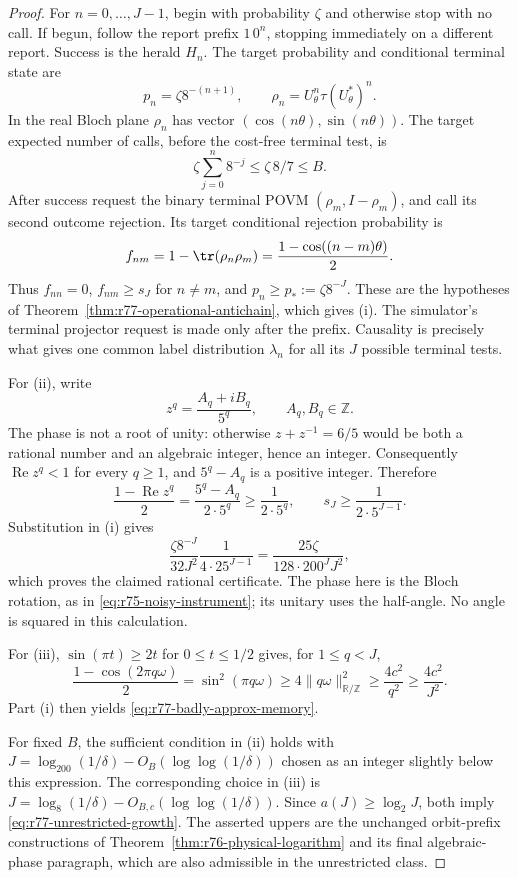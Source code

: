 \begin{proof}
For $n=0,\ldots,J-1$, begin with probability $\zeta$ and otherwise
stop with no call.  If begun, follow the report prefix $1\,0^n$,
stopping immediately on a different report.  Success is the herald
$H_n$.  The target probability and conditional terminal state are
\[
 p_n=\zeta8^{-(n+1)},\qquad
 \rho_n=U_\theta^n\tau(U_\theta^*)^n.
\]
In the real Bloch plane $\rho_n$ has vector
$(\cos(n\theta),\sin(n\theta))$.  The target expected number of
calls, before the cost-free terminal test, is
\[
 \zeta\sum_{j=0}^{n}8^{-j}\le\zeta\,8/7\le B.
\]
After success request the binary terminal POVM
$(\rho_m,I-\rho_m)$, and call its second outcome rejection.  Its
target conditional rejection probability is
\[
 f_{nm}=1-\tr(\rho_n\rho_m)
       =\frac{1-\cos((n-m)\theta)}2.
\]
Thus $f_{nn}=0$, $f_{nm}\ge s_J$ for $n\ne m$, and
$p_n\ge p_*:=\zeta8^{-J}$.  These are the hypotheses of
Theorem~\ref{thm:r77-operational-antichain}, which gives (i).
The simulator's terminal projector request is made only after the
prefix.  Causality is precisely what gives one common label
distribution $\lambda_n$ for all its $J$ possible terminal tests.

For (ii), write
\[
 z^q=\frac{A_q+iB_q}{5^q},\qquad A_q,B_q\in\mathbb Z.
\]
The phase is not a root of unity: otherwise $z+z^{-1}=6/5$ would
be both a rational number and an algebraic integer, hence an integer.
Consequently $\operatorname{Re}z^q<1$ for every $q\ge1$, and
$5^q-A_q$ is a positive integer.  Therefore
\[
 \frac{1-\operatorname{Re}z^q}{2}
 =\frac{5^q-A_q}{2\cdot5^q}\ge\frac1{2\cdot5^q},
 \qquad s_J\ge\frac1{2\cdot5^{J-1}}.
\]
Substitution in (i) gives
\[
 \frac{\zeta8^{-J}}{32J^2}\frac1{4\cdot25^{J-1}}
 =\frac{25\zeta}{128\cdot200^J J^2},
\]
which proves the claimed rational certificate.  The phase here is
the Bloch rotation, as in \eqref{eq:r75-noisy-instrument}; its unitary
uses the half-angle.  No angle is squared in this calculation.

For (iii), $\sin(\pi t)\ge2t$ for $0\le t\le1/2$ gives,
for $1\le q<J$,
\[
 \frac{1-\cos(2\pi q\omega)}2
 =\sin^2(\pi q\omega)
 \ge4\|q\omega\|_{\mathbb R/\mathbb Z}^2
 \ge\frac{4c^2}{q^2}\ge\frac{4c^2}{J^2}.
\]
Part (i) then yields \eqref{eq:r77-badly-approx-memory}.

For fixed $B$, the sufficient condition in (ii) holds with
$J=\log_{200}(1/\delta)-O_B(\log\log(1/\delta))$ chosen as an
integer slightly below this expression.  The corresponding choice in
(iii) is $J=\log_8(1/\delta)-O_{B,c}(\log\log(1/\delta))$.
Since $a(J)\ge\log_2J$, both imply
\eqref{eq:r77-unrestricted-growth}.  The asserted uppers are the
unchanged orbit-prefix constructions of
Theorem~\ref{thm:r76-physical-logarithm} and its final algebraic-phase
paragraph, which are also admissible in the unrestricted class.
\end{proof}

